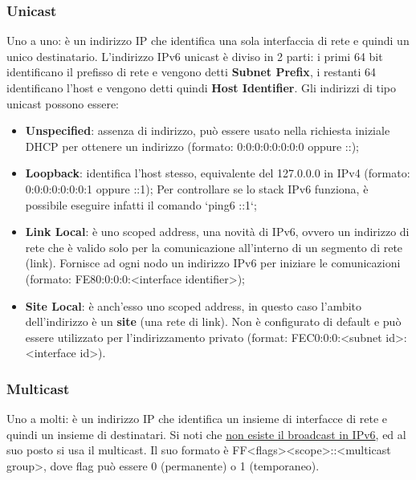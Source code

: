             \subsubsection*{Unicast}
            Uno a uno: è un indirizzo IP che identifica una sola interfaccia di rete e quindi un unico
            destinatario. L’indirizzo IPv6 unicast è diviso in 2 parti: i primi 64 bit identificano il prefisso di
            rete e vengono detti \textbf{Subnet Prefix}, i restanti 64 identificano l’host e vengono detti quindi \textbf{Host
            Identifier}. Gli indirizzi di tipo unicast possono essere:
            \begin{itemize}
                \item \textbf{Unspecified}: assenza di indirizzo, può essere usato nella richiesta iniziale DHCP per
                ottenere un indirizzo (formato: 0:0:0:0:0:0:0:0 oppure ::);
                \item \textbf{Loopback}: identifica l’host stesso, equivalente del 127.0.0.0 in IPv4
                (formato: 0:0:0:0:0:0:0:1 oppure ::1); Per controllare se lo stack IPv6 funziona, è
                possibile eseguire infatti il comando `ping6 ::1`;
                \item \textbf{Link Local}: è uno scoped address, una novità di IPv6, ovvero un indirizzo di rete che è
                valido solo per la comunicazione all’interno di un segmento di rete (link).
                Fornisce ad ogni nodo un indirizzo IPv6 per iniziare le comunicazioni
                (formato: FE80:0:0:0:<interface identifier>);
                \item \textbf{Site Local}: è anch’esso uno scoped address, in questo caso l’ambito dell’indirizzo è un
                \textbf{site} (una rete di link). Non è configurato di default e può essere utilizzato per
                l’indirizzamento privato (format: FEC0:0:0:<subnet id>:<interface id>).                
            \end{itemize}
            
            \subsubsection*{Multicast}
            Uno a molti: è un indirizzo IP che identifica un insieme di interfacce di rete e quindi un insieme
            di destinatari. Si noti che \underline{non esiste il broadcast in IPv6}, ed al suo posto si usa il multicast. Il suo
            formato è FF<flags><scope>::<multicast group>, dove flag può essere 0 (permanente) o 1
            (temporaneo).

